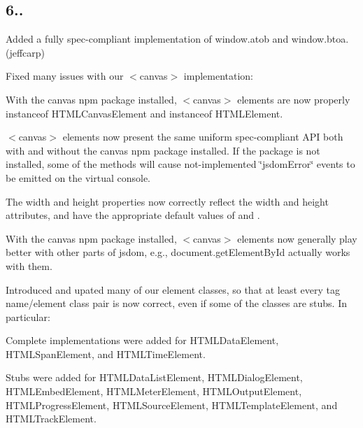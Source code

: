 \subsection*{6..}


\begin{DoxyItemize}
\item Added a fully spec-\/compliant implementation of {\ttfamily window.\+atob} and {\ttfamily window.\+btoa}. (jeffcarp)
\item Fixed many issues with our {\ttfamily $<$canvas$>$} implementation\+:
\begin{DoxyItemize}
\item With the {\ttfamily canvas} npm package installed, {\ttfamily $<$canvas$>$} elements are now properly {\ttfamily instanceof H\+T\+M\+L\+Canvas\+Element} and {\ttfamily instanceof H\+T\+M\+L\+Element}.
\item {\ttfamily $<$canvas$>$} elements now present the same uniform spec-\/compliant A\+PI both with and without the {\ttfamily canvas} npm package installed. If the package is not installed, some of the methods will cause not-\/implemented {\ttfamily \char`\"{}jsdom\+Error\char`\"{}} events to be emitted on the virtual console.
\item The {\ttfamily width} and {\ttfamily height} properties now correctly reflect the {\ttfamily width} and {\ttfamily height} attributes, and have the appropriate default values of {} and {}.
\item With the {\ttfamily canvas} npm package installed, {\ttfamily $<$canvas$>$} elements now generally play better with other parts of jsdom, e.\+g., {\ttfamily document.\+get\+Element\+By\+Id} actually works with them.
\end{DoxyItemize}
\item Introduced and upated many of our element classes, so that at least every tag name/element class pair is now correct, even if some of the classes are stubs. In particular\+:
\begin{DoxyItemize}
\item Complete implementations were added for {\ttfamily H\+T\+M\+L\+Data\+Element}, {\ttfamily H\+T\+M\+L\+Span\+Element}, and {\ttfamily H\+T\+M\+L\+Time\+Element}.
\item Stubs were added for {\ttfamily H\+T\+M\+L\+Data\+List\+Element}, {\ttfamily H\+T\+M\+L\+Dialog\+Element}, {\ttfamily H\+T\+M\+L\+Embed\+Element}, {\ttfamily H\+T\+M\+L\+Meter\+Element}, {\ttfamily H\+T\+M\+L\+Output\+Element}, {\ttfamily H\+T\+M\+L\+Progress\+Element}, {\ttfamily H\+T\+M\+L\+Source\+Element}, {\ttfamily H\+T\+M\+L\+Template\+Element}, and {\ttfamily H\+T\+M\+L\+Track\+Element}.

\end{DoxyItemize}
\end{DoxyItemize}
